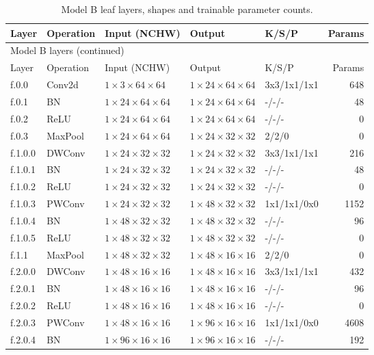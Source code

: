 \begingroup\scriptsize\setlength{\tabcolsep}{3pt}
\begin{longtable}{lllllr}
\caption{Model B leaf layers, shapes and trainable parameter counts.}\label{tab:model_b_layers}\\
\toprule Layer & Operation & Input (NCHW) & Output & K/S/P & Params \\ \midrule\endfirsthead
\multicolumn{6}{l}{Model B layers (continued)}\\\toprule Layer & Operation & Input (NCHW) & Output & K/S/P & Params \\ \midrule\endhead
f.0.0 & Conv2d & $1\times3\times64\times64$ & $1\times24\times64\times64$ & 3x3/1x1/1x1 & 648 \\
f.0.1 & BN & $1\times24\times64\times64$ & $1\times24\times64\times64$ & -/-/- & 48 \\
f.0.2 & ReLU & $1\times24\times64\times64$ & $1\times24\times64\times64$ & -/-/- & 0 \\
f.0.3 & MaxPool & $1\times24\times64\times64$ & $1\times24\times32\times32$ & 2/2/0 & 0 \\
f.1.0.0 & DWConv & $1\times24\times32\times32$ & $1\times24\times32\times32$ & 3x3/1x1/1x1 & 216 \\
f.1.0.1 & BN & $1\times24\times32\times32$ & $1\times24\times32\times32$ & -/-/- & 48 \\
f.1.0.2 & ReLU & $1\times24\times32\times32$ & $1\times24\times32\times32$ & -/-/- & 0 \\
f.1.0.3 & PWConv & $1\times24\times32\times32$ & $1\times48\times32\times32$ & 1x1/1x1/0x0 & 1152 \\
f.1.0.4 & BN & $1\times48\times32\times32$ & $1\times48\times32\times32$ & -/-/- & 96 \\
f.1.0.5 & ReLU & $1\times48\times32\times32$ & $1\times48\times32\times32$ & -/-/- & 0 \\
f.1.1 & MaxPool & $1\times48\times32\times32$ & $1\times48\times16\times16$ & 2/2/0 & 0 \\
f.2.0.0 & DWConv & $1\times48\times16\times16$ & $1\times48\times16\times16$ & 3x3/1x1/1x1 & 432 \\
f.2.0.1 & BN & $1\times48\times16\times16$ & $1\times48\times16\times16$ & -/-/- & 96 \\
f.2.0.2 & ReLU & $1\times48\times16\times16$ & $1\times48\times16\times16$ & -/-/- & 0 \\
f.2.0.3 & PWConv & $1\times48\times16\times16$ & $1\times96\times16\times16$ & 1x1/1x1/0x0 & 4608 \\
f.2.0.4 & BN & $1\times96\times16\times16$ & $1\times96\times16\times16$ & -/-/- & 192 \\

\end{longtable}
